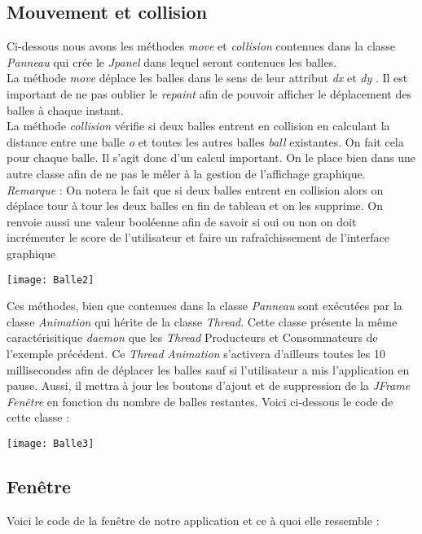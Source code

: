 \documentclass{article}
\begin{document}
\subsection{Mouvement et collision}
Ci-dessous nous avons les m\'{e}thodes \textit{move} et \textit{collision} contenues dans la classe \textit{Panneau} qui cr\'{e}e le \textit{Jpanel} dans lequel seront contenues les balles. 
\\ \indent La m\'{e}thode \textit{move} d\'{e}place les balles dans le sens de leur attribut \textit{dx} et \textit{dy} . Il est important de ne pas oublier le \textit{repaint} afin de pouvoir afficher le d\'{e}placement des balles \`{a} chaque instant.
\\ \indent La m\'{e}thode \textit{collision} v\'{e}rifie si deux balles entrent en collision en calculant la distance entre une balle \textit{o} et toutes les autres balles \textit{ball} existantes. On fait cela pour chaque balle. Il s'agit donc d'un calcul important. On le place bien dans une autre classe afin de ne pas le m\^{e}ler \`{a} la gestion de l'affichage graphique.
\\ \indent \textit{Remarque} : On notera le fait que si deux balles entrent en collision alors on d\'{e}place tour \`{a} tour les deux balles en fin de tableau et on les supprime. On renvoie aussi une valeur bool\'{e}enne afin de savoir si oui ou non on doit incr\'{e}menter le score de l'utilisateur et faire un rafra\^{i}chissement de l'interface graphique
\begin{center}
\texttt{[image: Balle2]} 
\end{center}
\bigskip
\bigskip
Ces m\'{e}thodes, bien que contenues dans la classe \textit{Panneau} sont ex\'{e}cut\'{e}es par la classe \textit{Animation} qui h\'{e}rite de la classe \textit{Thread}. Cette classe pr\'{e}sente la m\^{e}me caract\'{e}risitique \textit{daemon} que les \textit{Thread} Producteurs et Consommateurs de l'exemple pr\'{e}c\'{e}dent. Ce \textit{Thread} \textit{Animation} s'activera d'ailleurs toutes les 10 millisecondes afin de d\'{e}placer les balles sauf si l'utilisateur a mis l'application en pause. Aussi, il mettra \`{a} jour les boutons d'ajout et de suppression de la \textit{JFrame} \textit{Fen\^{e}tre} en fonction du nombre de balles restantes. Voici ci-dessous le code de cette classe :

\begin{center}
\texttt{[image: Balle3]} 
\end{center}

\subsection{Fen\^{e}tre}
Voici le code de la fen\^{e}tre de notre application et ce \`{a} quoi elle ressemble :
\end{document}
